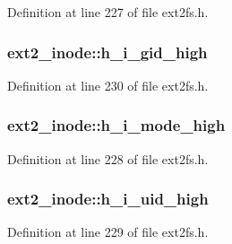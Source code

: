 \-Definition at line 227 of file ext2fs.\-h.

\hypertarget{structext2__inode_a8ef9a86d25e718f6ae6446a24406f1f6}{
\subsubsection[{h\-\_\-i\-\_\-gid\-\_\-high}]{ {\bf ext2\-\_\-inode\-::h\-\_\-i\-\_\-gid\-\_\-high}}}\label{structext2__inode_a8ef9a86d25e718f6ae6446a24406f1f6}


\-Definition at line 230 of file ext2fs.\-h.

\hypertarget{structext2__inode_a598925784279d286dc0e5bfc174bca3c}{
\subsubsection[{h\-\_\-i\-\_\-mode\-\_\-high}]{ {\bf ext2\-\_\-inode\-::h\-\_\-i\-\_\-mode\-\_\-high}}}\label{structext2__inode_a598925784279d286dc0e5bfc174bca3c}


\-Definition at line 228 of file ext2fs.\-h.

\hypertarget{structext2__inode_a33825c35c6021f636fcdc8d64c91c572}{
\subsubsection[{h\-\_\-i\-\_\-uid\-\_\-high}]{ {\bf ext2\-\_\-inode\-::h\-\_\-i\-\_\-uid\-\_\-high}}}\label{structext2__inode_a33825c35c6021f636fcdc8d64c91c572}


\-Definition at line 229 of file ext2fs.\-h.

